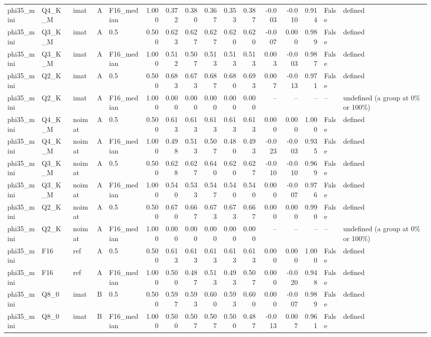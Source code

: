 \begin{tabular}{lllllrrrrrrrrrll}
phi35\_mini & Q4\_K\_M & imat & A & F16\_median & 1.000 & 0.372 & 0.380 & 0.367 & 0.353 & 0.387 & -0.003 & -0.010 & 0.914 & False & defined \\
phi35\_mini & Q3\_K\_M & imat & A & 0.5 & 0.500 & 0.623 & 0.627 & 0.627 & 0.620 & 0.620 & -0.007 & 0.000 & 0.989 & False & defined \\
phi35\_mini & Q3\_K\_M & imat & A & F16\_median & 1.000 & 0.512 & 0.507 & 0.513 & 0.513 & 0.513 & 0.003 & -0.003 & 0.987 & False & defined \\
phi35\_mini & Q2\_K & imat & A & 0.5 & 0.500 & 0.683 & 0.673 & 0.687 & 0.680 & 0.693 & 0.007 & -0.013 & 0.971 & False & defined \\
phi35\_mini & Q2\_K & imat & A & F16\_median & 1.000 & 0.000 & 0.000 & 0.000 & 0.000 & 0.000 & -- & -- & -- & -- & undefined (a group at 0\% or 100\%) \\
phi35\_mini & Q4\_K\_M & noimat & A & 0.5 & 0.500 & 0.613 & 0.613 & 0.613 & 0.613 & 0.613 & 0.000 & 0.000 & 1.000 & False & defined \\
phi35\_mini & Q4\_K\_M & noimat & A & F16\_median & 1.000 & 0.498 & 0.513 & 0.507 & 0.480 & 0.493 & -0.023 & -0.003 & 0.935 & False & defined \\
phi35\_mini & Q3\_K\_M & noimat & A & 0.5 & 0.500 & 0.628 & 0.627 & 0.640 & 0.620 & 0.627 & -0.010 & -0.010 & 0.969 & False & defined \\
phi35\_mini & Q3\_K\_M & noimat & A & F16\_median & 1.000 & 0.540 & 0.533 & 0.547 & 0.540 & 0.540 & 0.000 & -0.007 & 0.976 & False & defined \\
phi35\_mini & Q2\_K & noimat & A & 0.5 & 0.500 & 0.670 & 0.667 & 0.673 & 0.673 & 0.667 & 0.000 & 0.000 & 0.990 & False & defined \\
phi35\_mini & Q2\_K & noimat & A & F16\_median & 1.000 & 0.000 & 0.000 & 0.000 & 0.000 & 0.000 & -- & -- & -- & -- & undefined (a group at 0\% or 100\%) \\
phi35\_mini & F16 & ref & A & 0.5 & 0.500 & 0.613 & 0.613 & 0.613 & 0.613 & 0.613 & 0.000 & 0.000 & 1.000 & False & defined \\
phi35\_mini & F16 & ref & A & F16\_median & 1.000 & 0.500 & 0.487 & 0.513 & 0.493 & 0.507 & 0.000 & -0.020 & 0.948 & False & defined \\
phi35\_mini & Q8\_0 & imat & B & 0.5 & 0.500 & 0.597 & 0.593 & 0.600 & 0.593 & 0.600 & 0.000 & -0.007 & 0.989 & False & defined \\
phi35\_mini & Q8\_0 & imat & B & F16\_median & 1.000 & 0.500 & 0.507 & 0.507 & 0.500 & 0.487 & -0.013 & 0.007 & 0.961 & False & defined \\

\end{tabular}
